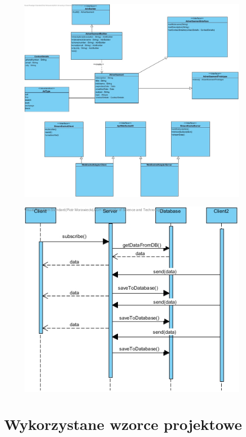 \documentclass{sprawozdanie-agh}
\begin{document}
	\begin{figure}[H]
		\centering
		\includegraphics[scale=0.5]{prototype.jpg}
	\end{figure}
	\begin{figure}[H]
		\centering
		\includegraphics[scale=0.5]{sekwencyjny.jpg}
	\end{figure}
	\section{Wykorzystane wzorce projektowe}
\end{document}
